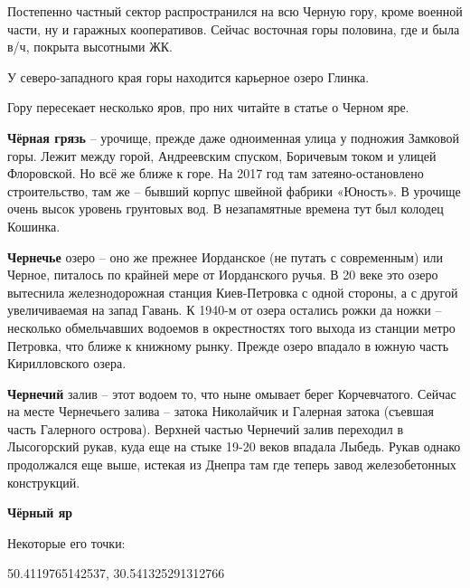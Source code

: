 Постепенно частный сектор распространился на всю Черную гору, кроме военной части, ну и гаражных кооперативов. Сейчас восточная горы половина, где и была в/ч, покрыта высотными ЖК.

У северо-западного края горы находится карьерное озеро Глинка.


Гору пересекает несколько яров, про них читайте в статье о Черном яре.\\

\medskip

\textbf{Чёрная грязь} – урочище, прежде даже одноименная улица у подножия Замковой горы. Лежит между горой, Андреевским спуском, Боричевым током и улицей Флоровской. Но всё же ближе к горе. На 2017 год там затеяно-остановлено строительство, там же – бывший корпус швейной фабрики «Юность». В урочище очень высок уровень грунтовых вод. В незапамятные времена тут был колодец Кошинка.\\

\medskip

\textbf{Чернечье} озеро – оно же прежнее Иорданское (не путать с современным) или Черное, питалось по крайней мере от Иорданского ручья. В 20 веке это озеро вытеснила железнодорожная станция Киев-Петровка с одной стороны, а с другой увеличиваемая на запад Гавань. К 1940-м от озера остались рожки да ножки – несколько обмельчавших водоемов в окрестностях того выхода из станции метро Петровка, что ближе к книжному рынку. Прежде озеро впадало в южную часть Кирилловского озера.\\ 

\medskip

\textbf{Чернечий} залив – этот водоем то, что ныне омывает берег Корчевчатого. Сейчас на месте Чернечьего залива – затока Николайчик и Галерная затока (съевшая часть Галерного острова). Верхней частью Чернечий залив переходил в Лысогорский рукав, куда еще на стыке 19-20 веков впадала Лыбедь. Рукав однако продолжался еще выше, истекая из Днепра там где теперь завод железобетонных конструкций.\\

\medskip


\textbf{Чёрный яр} 

Некоторые его точки:

50.4119765142537, 30.541325291312766

